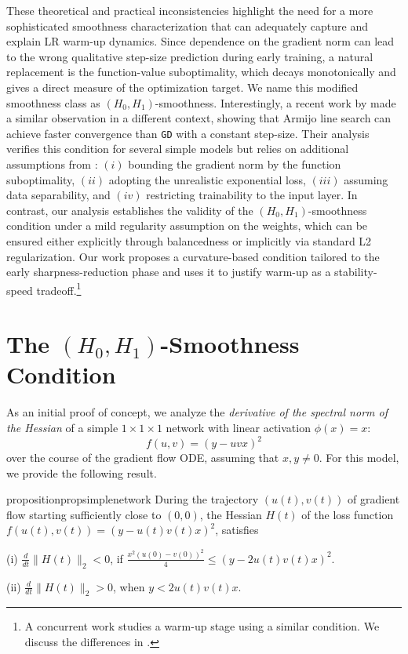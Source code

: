 \documentclass[a4paper,11pt]{article}
\newcommand{\algname}[1]{\texttt{#1}}
\newcommand{\1}{\mathbbm{1}}
\theoremstyle{plain}
\begin{document}
These theoretical and practical inconsistencies highlight the need for a more sophisticated smoothness characterization that can adequately capture and explain LR warm-up dynamics. Since dependence on the gradient norm can lead to the wrong qualitative step-size prediction during early training, a natural replacement is the function-value suboptimality, which decays monotonically and gives a direct measure of the optimization target. We name this modified smoothness class as $(H_0, H_1)$-smoothness. Interestingly, a recent work by \citet{vaswani2025armijo} made a similar observation in a different context, showing that Armijo line search can achieve faster convergence than \algname{GD} with a constant step-size. Their analysis verifies this condition for several simple models but relies on additional assumptions from \citet{taheri2023fast}: $(i)$ bounding the gradient norm by the function suboptimality, $(ii)$ adopting the unrealistic exponential loss, $(iii)$ assuming data separability, and $(iv)$ restricting trainability to the input layer. In contrast, our analysis establishes the validity of the $(H_0, H_1)$-smoothness condition under a mild regularity assumption on the weights, which can be ensured either explicitly through balancedness or implicitly via standard L2 regularization. Our work proposes a curvature-based condition tailored to the early sharpness-reduction phase and uses it to justify warm-up as a stability-speed tradeoff.\footnote{A concurrent work \citep{liu2025theoretical} studies a warm-up stage using a similar condition. We discuss the differences in .}



\section{The $(H_0,H_1)$-Smoothness Condition}
\label{sec:new_smoothness}


As an initial proof of concept, we analyze the \emph{derivative of the spectral norm of the Hessian} of a simple $1\times1\times1$ network with linear activation $\phi(x)=x$:
\begin{equation*}
    f(u,v) = (y - uvx)^2
\end{equation*}
over the course of the gradient flow ODE, assuming that $x,y \neq 0$. For this model, we provide the following result.
\begin{restatable}{proposition}{propsimplenetwork}
\label{prop:1x1x1 network}
During the trajectory $(u(t),v(t))$ of gradient flow starting sufficiently close to $(0,0)$, the Hessian $H(t)$ of the loss function $f(u(t),v(t)) = (y-u(t) v(t)x)^2$, satisfies

(i) $\frac{d}{dt} \|H(t)\|_2 < 0$, if $\frac{x^2 (u(0)-v(0))^2}{4} \leq (y-2u(t)v(t)x)^2$.

(ii) $\frac{d}{dt} \|H(t)\|_2 > 0$, when $y<2u(t)v(t)x$.

\end{restatable}
\end{document}
